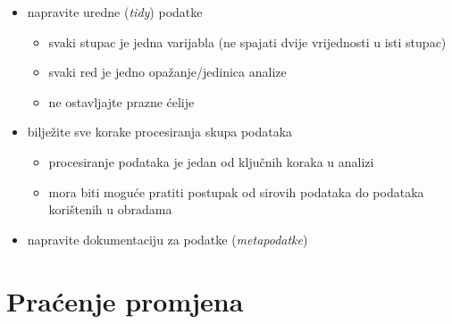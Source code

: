 \documentclass[aspectratio=169]{beamer}
\begin{document}
\begin{frame}
    \begin{itemize}
        \setlength{\itemsep}{2em}

        \item napravite uredne (\textit{tidy}) podatke

        \begin{itemize}
            \item svaki stupac je jedna varijabla (ne spajati dvije vrijednosti
                u isti stupac)

            \item svaki red je jedno opažanje/jedinica analize

            \item ne ostavljajte prazne ćelije

        \end{itemize}

        \pause

        \item bilježite sve korake procesiranja skupa podataka

        \pause

        \begin{itemize}
            \item procesiranje podataka je jedan od ključnih koraka u analizi

            \pause

            \item mora biti moguće pratiti postupak od sirovih podataka do
                podataka korištenih u obradama

        \end{itemize}

        \pause

        \item napravite dokumentaciju za podatke (\textit{metapodatke})
    \end{itemize}
\end{frame}

\section{Praćenje promjena}
\end{document}
